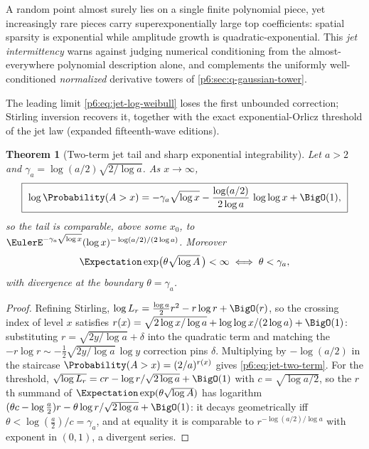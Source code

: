 \documentclass[11pt,oneside]{article}
\numberwithin{equation}{section}
\newtheorem{theorem}{Theorem}[section]
\theoremstyle{definition}
\theoremstyle{remark}
\begin{document}
A random point almost surely lies on a single finite polynomial piece, yet
increasingly rare pieces carry superexponentially large top coefficients:
spatial sparsity is exponential while amplitude growth is
quadratic-exponential.  This \emph{jet intermittency} warns against judging
numerical conditioning from the almost-everywhere polynomial description
alone, and complements the uniformly well-conditioned \emph{normalized}
derivative towers of \cref{p6:sec:q-gaussian-tower}.

The leading limit \eqref{p6:eq:jet-log-weibull} loses the first unbounded
correction; Stirling inversion recovers it, together with the exact
exponential-Orlicz threshold of the jet law (expanded fifteenth-wave
editions).

\begin{theorem}[Two-term jet tail and sharp exponential integrability]
\label{p6:thm:jet-two-term}
Let $a>2$ and $\gamma_a=\log(a/2)\sqrt{2/\log a}$.  As $x\to\infty$,
\begin{equation}\label{p6:eq:jet-two-term}
 \boxed{\ \log\Probability(A>x)
 =-\gamma_a\sqrt{\log x}
 -\frac{\log(a/2)}{2\log a}\,\log\log x+\BigO(1),\ }
\end{equation}
so the tail is comparable, above some $x_0$, to
$\EulerE^{-\gamma_a\sqrt{\log x}}(\log x)^{-\log(a/2)/(2\log a)}$.  Moreover
\begin{equation}\label{p6:eq:jet-orlicz}
 \Expectation\exp\bigl(\theta\sqrt{\log A}\,\bigr)<\infty
 \iff\theta<\gamma_a,
\end{equation}
with divergence at the boundary $\theta=\gamma_a$.
\end{theorem}

\begin{proof}
Refining Stirling,
$\log L_r=\tfrac{\log a}2r^2-r\log r+\BigO(r)$, so the crossing index of
level $x$ satisfies
$r(x)=\sqrt{2\log x/\log a}+\log\log x/(2\log a)+\BigO(1)$: substituting
$r=\sqrt{2y/\log a}+\delta$ into the quadratic term and matching the
$-r\log r\sim-\tfrac12\sqrt{2y/\log a}\,\log y$ correction pins
$\delta$.  Multiplying by $-\log(a/2)$ in the staircase
$\Probability(A>x)=(2/a)^{r(x)}$ gives \eqref{p6:eq:jet-two-term}.  For the
threshold, $\sqrt{\log L_r}=cr-\log r/\sqrt{2\log a}+\BigO(1)$ with
$c=\sqrt{\log a/2}$, so the $r$th summand of
$\Expectation\exp(\theta\sqrt{\log A})$ has logarithm
$(\theta c-\log\tfrac a2)r-\theta\log r/\sqrt{2\log a}+\BigO(1)$: it
decays geometrically iff $\theta<\log(\tfrac a2)/c=\gamma_a$, and at
equality it is comparable to $r^{-\log(a/2)/\log a}$ with exponent in
$(0,1)$, a divergent series.
\end{proof}
\end{document}
